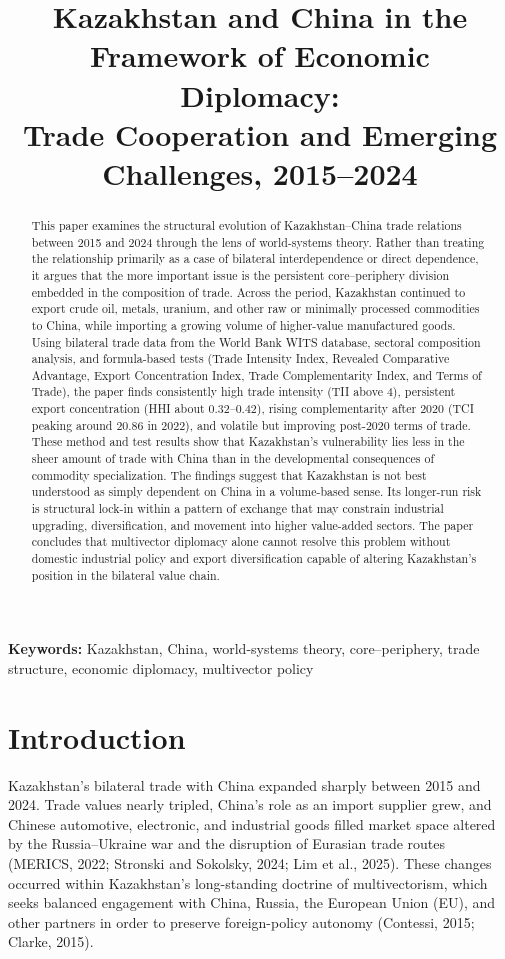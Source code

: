 \documentclass[12pt]{article}
\title{Kazakhstan and China in the Framework of Economic Diplomacy:\\
Trade Cooperation and Emerging Challenges, 2015--2024}
\author{}
\date{}
\begin{document}
\maketitle

\begin{abstract}
This paper examines the structural evolution of Kazakhstan--China trade relations between 2015 and 2024 through the lens of world-systems theory. Rather than treating the relationship primarily as a case of bilateral interdependence or direct dependence, it argues that the more important issue is the persistent core--periphery division embedded in the composition of trade. Across the period, Kazakhstan continued to export crude oil, metals, uranium, and other raw or minimally processed commodities to China, while importing a growing volume of higher-value manufactured goods. Using bilateral trade data from the World Bank WITS database, sectoral composition analysis, and formula-based tests (Trade Intensity Index, Revealed Comparative Advantage, Export Concentration Index, Trade Complementarity Index, and Terms of Trade), the paper finds consistently high trade intensity (TII above 4), persistent export concentration (HHI about 0.32--0.42), rising complementarity after 2020 (TCI peaking around 20.86 in 2022), and volatile but improving post-2020 terms of trade. These method and test results show that Kazakhstan's vulnerability lies less in the sheer amount of trade with China than in the developmental consequences of commodity specialization. The findings suggest that Kazakhstan is not best understood as simply dependent on China in a volume-based sense. Its longer-run risk is structural lock-in within a pattern of exchange that may constrain industrial upgrading, diversification, and movement into higher value-added sectors. The paper concludes that multivector diplomacy alone cannot resolve this problem without domestic industrial policy and export diversification capable of altering Kazakhstan's position in the bilateral value chain.
\end{abstract}

\noindent\textbf{Keywords:} Kazakhstan, China, world-systems theory, core--periphery, trade structure, economic diplomacy, multivector policy

\section{Introduction}

Kazakhstan's bilateral trade with China expanded sharply between 2015 and 2024. Trade values nearly tripled, China's role as an import supplier grew, and Chinese automotive, electronic, and industrial goods filled market space altered by the Russia--Ukraine war and the disruption of Eurasian trade routes (MERICS, 2022; Stronski and Sokolsky, 2024; Lim et al., 2025). These changes occurred within Kazakhstan's long-standing doctrine of multivectorism, which seeks balanced engagement with China, Russia, the European Union (EU), and other partners in order to preserve foreign-policy autonomy (Contessi, 2015; Clarke, 2015).
\end{document}
